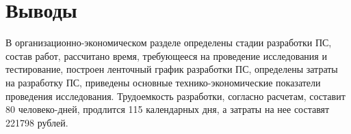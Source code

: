 \newpage
\section*{Выводы}
В организационно-экономическом разделе определены стадии разработки ПС, состав работ, рассчитано время, требующееся на
проведение исследования и тестирование, построен ленточный график разработки ПС, определены затраты на разработку ПС,
приведены основные технико-экономические показатели проведения исследования.
Трудоемкость разработки, согласно расчетам, составит 80 человеко-дней, продлится 115 календарных дня, а затраты на
нее составят 221798 рублей.

\newpage
